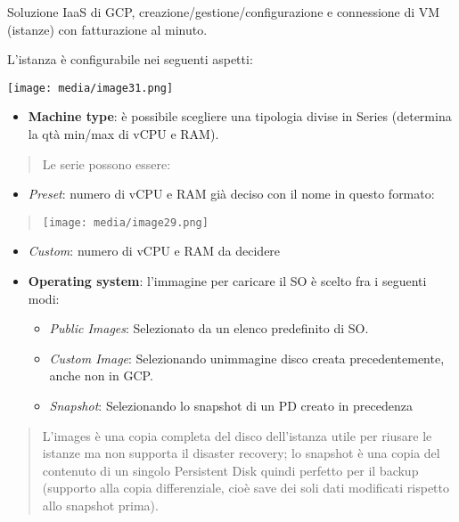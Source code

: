 Soluzione IaaS di GCP, creazione/gestione/configurazione e connessione
di VM (istanze) con fatturazione al minuto.

L'istanza è configurabile nei seguenti aspetti:

\texttt{[image: media/image31.png]}

\begin{itemize}
\item
  \textbf{Machine type}: è possibile scegliere una tipologia divise in
  Series (determina la qtà min/max di vCPU e RAM).
\end{itemize}

\begin{quote}
Le serie possono essere:
\end{quote}

\begin{itemize}
\item
  \emph{Preset}: numero di vCPU e RAM già deciso con il nome in questo
  formato:
\end{itemize}

\begin{quote}
\texttt{[image: media/image29.png]}
\end{quote}

\begin{itemize}
\item
  \emph{Custom}: numero di vCPU e RAM da decidere
\end{itemize}

\begin{itemize}
\item
  \textbf{Operating system}: l'immagine per caricare il SO è scelto fra
  i seguenti modi:

  \begin{itemize}
  \item
    \emph{Public Images}: Selezionato da un elenco predefinito di SO.
  \item
    \emph{Custom Image}: Selezionando un\textquotesingle immagine disco
    creata precedentemente, anche non in GCP.
  \item
    \emph{Snapshot}: Selezionando lo snapshot di un PD creato in
    precedenza
  \end{itemize}
\end{itemize}

\begin{quote}
L'images è una copia completa del disco dell'istanza utile per riusare
le istanze ma non supporta il disaster recovery; lo snapshot è una copia
del contenuto di un singolo Persistent Disk quindi perfetto per il
backup (supporto alla copia differenziale, cioè save dei soli dati
modificati rispetto allo snapshot prima).
\end{quote}

